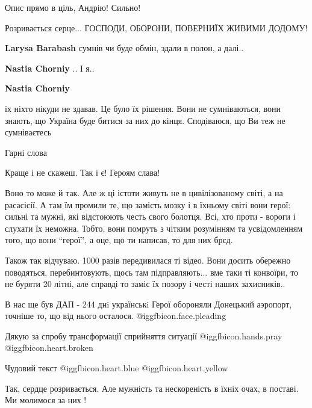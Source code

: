 \begin{itemize}
Опис прямо в ціль, Андрію! Сильно!


Розривається серце... ГОСПОДИ, ОБОРОНИ, ПОВЕРНИЇХ ЖИВИМИ ДОДОМУ!

\begin{itemize} %
\textbf{Larysa Barabash} сумнів чи буде обмін, здали в полон, а далі..

\textbf{Nastia Chorniy} ..
І я..

\textbf{Nastia Chorniy} 

їх ніхто нікуди не здавав. Це було їх рішення. Вони не сумніваються, вони
знають, що Україна буде битися за них до кінця. Сподіваюся, що Ви теж не
сумніваєтесь

\end{itemize} %

Гарні слова

Краще і не скажеш. Так і є! Героям слава!


Воно то може й так. Але ж ці істоти живуть не в цивілізованому світі, а на
расасісії. А там їм промили те, що замість мозку і в їхньому світі вони герої:
сильні та мужні, які відстоюють честь свого болотця. Всі, хто проти - вороги і
слухати їх неможна. Тобто, вони помруть з чітким розумінням та усвідомленням
того, що вони \enquote{герої}, а оце, що ти написав, то для них брєд.


Також так відчуваю. 1000 разів передивилася ті відео. Вони досить обережно
поводяться, перебинтовують, щось там підправляють... вме таки ті конвоїри, то
не буряти 20 літні, але справді то заміс їх позору і честі наших захисників..


В нас ще був ДАП - 244 днi українськi Герої обороняли Донецький аэропорт,
точнiше то, що вiд нього осталося.  @igg{fbicon.face.pleading} 

Дякую за спробу трансформації сприйняття ситуації  @igg{fbicon.hands.pray} @igg{fbicon.heart.broken} 

Чудовий текст @igg{fbicon.heart.blue}  @igg{fbicon.heart.yellow} 


Так, сердце розривається. Але мужність та нескореність в їхніх очах, в поставі.
Ми молимося за них !


\end{itemize}

